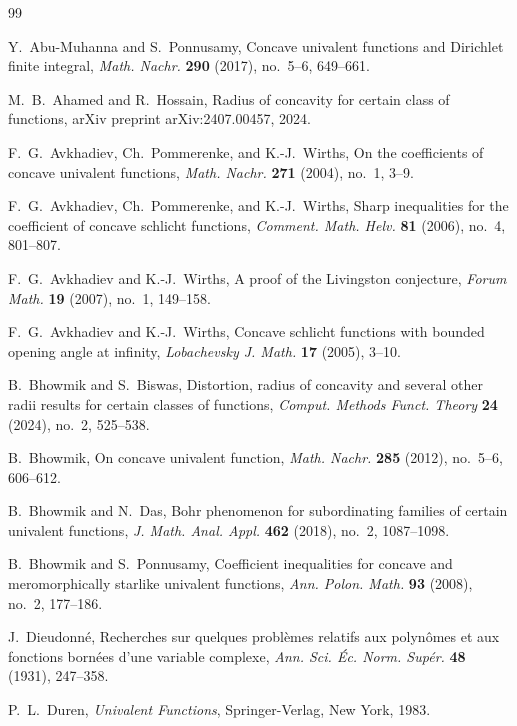 \documentclass[12pt]{article}
\begin{document}
\begin{thebibliography}{99}

Y.~Abu-Muhanna and S.~Ponnusamy,
Concave univalent functions and Dirichlet finite integral,
\emph{Math. Nachr.}
\textbf{290} (2017), no.~5--6, 649--661.

M.~B.~Ahamed and R.~Hossain,
Radius of concavity for certain class of functions,
arXiv preprint arXiv:2407.00457, 2024.

F.~G.~Avkhadiev, Ch.~Pommerenke, and K.-J.~Wirths,
On the coefficients of concave univalent functions,
\emph{Math. Nachr.}
\textbf{271} (2004), no.~1, 3--9.

F.~G.~Avkhadiev, Ch.~Pommerenke, and K.-J.~Wirths,
Sharp inequalities for the coefficient of concave schlicht functions,
\emph{Comment. Math. Helv.}
\textbf{81} (2006), no.~4, 801--807.

F.~G.~Avkhadiev and K.-J.~Wirths,
A proof of the Livingston conjecture,
\emph{Forum Math.}
\textbf{19} (2007), no.~1, 149--158.

F.~G.~Avkhadiev and K.-J.~Wirths,
Concave schlicht functions with bounded opening angle at infinity,
\emph{Lobachevsky J. Math.}
\textbf{17} (2005), 3--10.

B.~Bhowmik and S.~Biswas,
Distortion, radius of concavity and several other radii results for certain classes of functions,
\emph{Comput. Methods Funct. Theory}
\textbf{24} (2024), no.~2, 525--538.

B.~Bhowmik,
On concave univalent function,
\emph{Math. Nachr.}
\textbf{285} (2012), no.~5--6, 606--612.

B.~Bhowmik and N.~Das,
Bohr phenomenon for subordinating families of certain univalent functions,
\emph{J. Math. Anal. Appl.}
\textbf{462} (2018), no.~2, 1087--1098.

B.~Bhowmik and S.~Ponnusamy,
Coefficient inequalities for concave and meromorphically starlike univalent functions,
\emph{Ann. Polon. Math.}
\textbf{93} (2008), no.~2, 177--186.

J.~Dieudonn\'e,
Recherches sur quelques probl\`emes relatifs aux polyn\^omes et aux fonctions born\'ees d'une variable complexe,
\emph{Ann. Sci. \'Ec. Norm. Sup\'er.}
\textbf{48} (1931), 247--358.

P.~L.~Duren,
\emph{Univalent Functions},
Springer-Verlag, New York, 1983.


\end{thebibliography}
\end{document}

